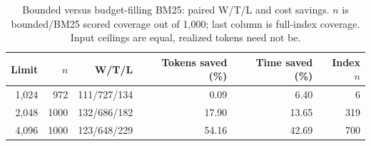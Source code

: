 \begin{table}[H]
\centering
\footnotesize
\setlength{\tabcolsep}{4pt}
\caption{Bounded versus budget-filling BM25: paired W/T/L and cost savings. $n$ is bounded/BM25 scored coverage out of 1,000; last column is full-index coverage. Input ceilings are equal, realized tokens need not be.}
\label{tab:sub-budgets}
\begin{tabular}{rrrrrr}
\toprule
Limit & $n$ & W/T/L & Tokens saved (\%) & Time saved (\%) & Index $n$ \\
\midrule
1,024 & 972 & 111/727/134 & 0.09 & 6.40 & 6 \\
2,048 & 1000 & 132/686/182 & 17.90 & 13.65 & 319 \\
4,096 & 1000 & 123/648/229 & 54.16 & 42.69 & 700 \\
\bottomrule
\end{tabular}
\end{table}
